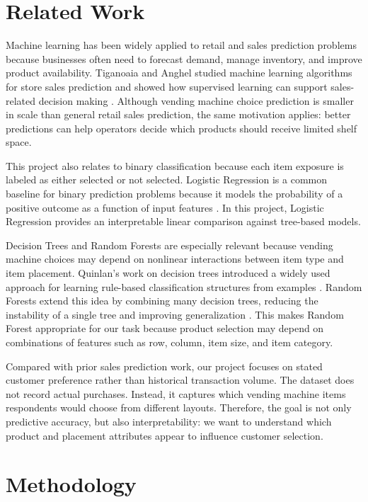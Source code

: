 \documentclass{article}
\begin{document}
\section{Related Work}

Machine learning has been widely applied to retail and sales prediction problems because businesses often need to forecast demand, manage inventory, and improve product availability. Tiganoaia and Anghel studied machine learning algorithms for store sales prediction and showed how supervised learning can support sales-related decision making \cite{tiganoaia2024}. Although vending machine choice prediction is smaller in scale than general retail sales prediction, the same motivation applies: better predictions can help operators decide which products should receive limited shelf space.

This project also relates to binary classification because each item exposure is labeled as either selected or not selected. Logistic Regression is a common baseline for binary prediction problems because it models the probability of a positive outcome as a function of input features \cite{cox1958}. In this project, Logistic Regression provides an interpretable linear comparison against tree-based models.

Decision Trees and Random Forests are especially relevant because vending machine choices may depend on nonlinear interactions between item type and item placement. Quinlan's work on decision trees introduced a widely used approach for learning rule-based classification structures from examples \cite{quinlan1986}. Random Forests extend this idea by combining many decision trees, reducing the instability of a single tree and improving generalization \cite{breiman2001}. This makes Random Forest appropriate for our task because product selection may depend on combinations of features such as row, column, item size, and item category.

Compared with prior sales prediction work, our project focuses on stated customer preference rather than historical transaction volume. The dataset does not record actual purchases. Instead, it captures which vending machine items respondents would choose from different layouts. Therefore, the goal is not only predictive accuracy, but also interpretability: we want to understand which product and placement attributes appear to influence customer selection.

\section{Methodology}
\end{document}
